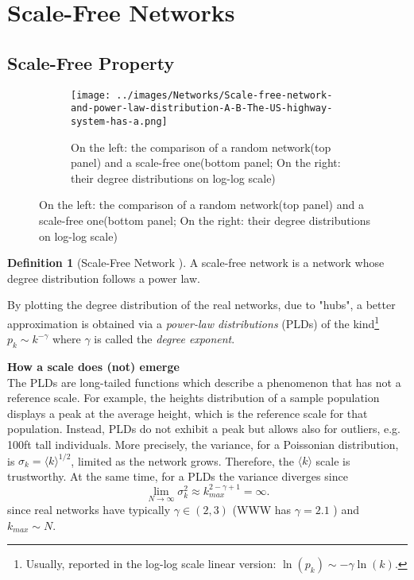 \documentclass[a4paper,10pt, oneside]{book} %
\theoremstyle{definition}
\newtheorem{definition}{Definition}[section]
\begin{document}
\newpage
\section{Scale-Free Networks}
\subsection{Scale-Free Property}

\begin{figure}[h]
    \begin{subfigure}{\textwidth}
        \texttt{[image: ../images/Networks/Scale-free-network-and-power-law-distribution-A-B-The-US-highway-system-has-a.png]}
        \centering
        \caption{On the left: the comparison of a random network(top panel) and a scale-free one(bottom panel; On the right: their degree distributions on log-log scale) \cite{barabasi::2016networkbook}}
        \label{fig:PLDsVSEBDs}
    \end{subfigure}
\end{figure}

\begin{definition}[Scale-Free Network \cite{Barabasi:1999_ScalRndNet}]
	A scale-free network is a network whose degree distribution follows a power law.
\end{definition}

By plotting the degree distribution of the real networks, due to "hubs", a better approximation is obtained via a \textit{power-law distributions} (PLDs) of the kind\footnote{Usually, reported in the log-log scale linear version: $\ln(p_k) \sim -\gamma \ln(k)$.} $p_k \sim k^{-\gamma}$  where $\gamma$ is called the \textit{degree exponent}. 

{\large \textbf{How a scale does (not) emerge}} \\
The PLDs are long-tailed functions which describe a phenomenon that has not a reference scale.
For example, the heights distribution of a sample population displays a peak at the average height, which is the reference scale for that population. Instead, PLDs do not exhibit a peak but allows also for outliers, e.g. 100ft tall individuals.
More precisely, the variance, for a Poissonian distribution, is $\sigma_k = \langle k \rangle ^ {1/2}$, limited as the network grows. Therefore, the $\langle k \rangle$ scale is trustworthy. 
At the same time, for a PLDs the variance diverges since \cite{barabasi::2016networkbook}	
\begin{equation}
	\lim_{N \to \infty} \sigma_k^2 \approx k_{max}^{2-\gamma+1} = \infty.
	\label{eq:sigma_SFnets}
\end{equation}
since real networks have typically $\gamma \in (2,3)$ (WWW has $\gamma =  2.1$ \cite{barabasi::2016networkbook}) and $k_{max} \sim N$. 
\end{document}
